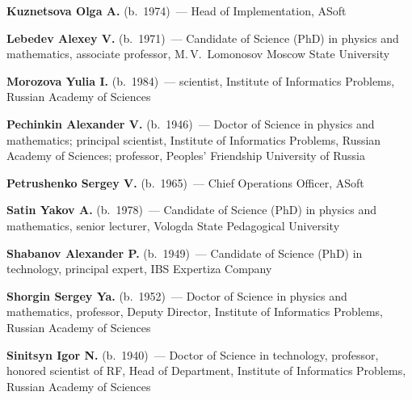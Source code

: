 \begin{multicols}{2}
\vspace*{3pt}

\noindent 
\textbf{Kuznetsova Olga A.} (b.\ 1974)~--- Head of Implementation, ASoft

\vspace*{3pt}

\noindent 
\textbf{Lebedev Alexey V.} (b.\ 1971)~--- Candidate of Science (PhD) in physics and 
mathematics, associate professor, M.\,V.~Lomonosov Moscow State University

\vspace*{3pt}

\noindent 
\textbf{Morozova Yulia I.} (b.\ 1984)~--- scientist, 
Institute of Informatics Problems, Russian Academy of Sciences  

\vspace*{3pt}

\noindent
\textbf{Pechinkin Alexander V.} (b.\ 1946)~--- Doctor of Science in physics and mathematics;
principal scientist, Institute of Informatics Problems, Russian Academy of
Sciences; professor, Peoples' Friendship University of Russia

\vspace*{3pt}

\noindent
\textbf{Petrushenko Sergey V.} (b.\ 1965)~---   Chief Operations Officer, ASoft

\vspace*{3pt}

\noindent
\textbf{Satin Yakov A.} (b.\ 1978)~--- Candidate of Science (PhD) in physics and
mathematics, senior lecturer, Vologda State Pedagogical University 
\columnbreak


\noindent
\textbf{Shabanov Alexander P.} (b.\ 1949)~--- Candidate of Science (PhD) in technology, 
principal expert, IBS Expertiza Company

\vspace*{3pt}

\noindent
\textbf{Shorgin Sergey Ya.} (b.\ 1952)~--- Doctor of Science in physics and 
mathematics, professor, Deputy Director, Institute of Informatics Problems, 
Russian Academy of Sciences

\vspace*{3pt}

\noindent
\textbf{Sinitsyn Igor N.} (b.\ 1940)~--- Doctor of Science in technology,
professor, honored scientist  of RF,
Head of Department, Institute of Informatics Problems,  Russian Academy of Sciences


\end{multicols}
